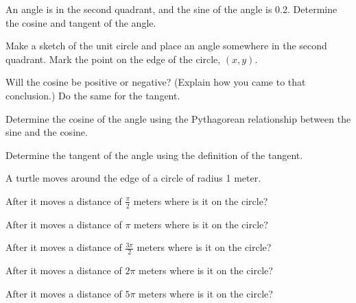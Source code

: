 \begin{problem}
  \item An angle is in the second quadrant, and the sine of the angle is 0.2.
    Determine the cosine and tangent of the angle.
  \begin{subproblem}
    \item Make a sketch of the unit circle and place an angle somewhere in the second quadrant.
    Mark the point on the edge of the circle, $(x,y)$.
    \vfill

    \item Will the cosine be positive or negative? (Explain how you came to that conclusion.)
      Do the same for the tangent.
      \vfill

    \item Determine the cosine of the angle using the Pythagorean relationship between the sine
        and the cosine.
        \vfill

    \item Determine the tangent of the angle using the definition of the tangent.
      \vfill
  \end{subproblem}

  \clearpage

  \item A turtle moves around the edge of a circle of radius 1 meter.
    \begin{subproblem}
      \item After it moves a distance of $\frac{\pi}{2}$ meters where is it on the circle?
      \vfill
      \item After it moves a distance of $\pi$ meters where is it on the circle?
      \vfill
      \item After it moves a distance of $\frac{3\pi}{2}$ meters where is it on the circle?
      \vfill
      \item After it moves a distance of $2\pi$ meters where is it on the circle?
      \vfill
      \item After it moves a distance of $5\pi$ meters where is it on the circle?
      \vfill
    \end{subproblem}

\clearpage


\end{problem}
